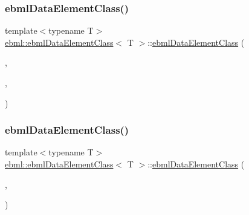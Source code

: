 \subsubsection{\texorpdfstring{ebml\+Data\+Element\+Class()}{ebmlDataElementClass()}\hspace{0.1cm}{\footnotesize\ttfamily [3/6]}}
{\footnotesize\ttfamily template$<$typename T$>$ \\
\mbox{\hyperlink{classebml_1_1ebmlDataElementClass}{ebml\+::ebml\+Data\+Element\+Class}}$<$ T $>$\+::\mbox{\hyperlink{classebml_1_1ebmlDataElementClass}{ebml\+Data\+Element\+Class}} (\begin{DoxyParamCaption}\item[{const char $\ast$}]{,  }\item[{const std\+::wstring \&}]{,  }\item[{T \&\&}]{ }\end{DoxyParamCaption})}

\mbox{\label{classebml_1_1ebmlDataElementClass_a96c16b441ed04a1c34ff2f52d6a86655}} 
\subsubsection{\texorpdfstring{ebml\+Data\+Element\+Class()}{ebmlDataElementClass()}\hspace{0.1cm}{\footnotesize\ttfamily [4/6]}}
{\footnotesize\ttfamily template$<$typename T$>$ \\
\mbox{\hyperlink{classebml_1_1ebmlDataElementClass}{ebml\+::ebml\+Data\+Element\+Class}}$<$ T $>$\+::\mbox{\hyperlink{classebml_1_1ebmlDataElementClass}{ebml\+Data\+Element\+Class}} (\begin{DoxyParamCaption}\item[{\mbox{\hyperlink{namespaceebml_a86c5f604ddf12a74aa9812e997a58691}{ebml\+I\+D\+\_\+t}}}]{,  }\item[{const std\+::wstring \&}]{ }\end{DoxyParamCaption})}

\mbox{\label{classebml_1_1ebmlDataElementClass_a7b0726f332f9abadac8b7b4672cf1013}} 
